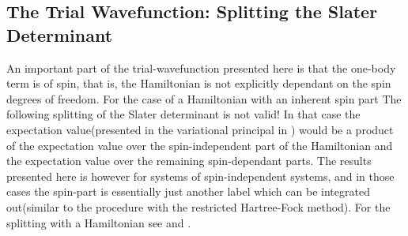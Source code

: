     \subsection{The Trial Wavefunction: Splitting the Slater Determinant}
        An important part of the trial-wavefunction presented here is that the
        one-body term is  of spin, that is, the Hamiltonian
        is not explicitly dependant on the spin degrees of freedom. For the
        case of a Hamiltonian with an inherent spin part The following
        splitting of the Slater determinant is not valid! In that case the
        expectation value(presented in the variational principal in
        ) would be a product of the expectation value over the
        spin-independent part of the Hamiltonian and the expectation value over
        the remaining spin-dependant parts\cite{spinDep}. The results presented
        here is however for systems of spin-independent systems, and in those
        cases the spin-part is essentially just another label which can be
        integrated out(similar to the procedure with the restricted
        Hartree-Fock method). For the splitting with a 
        Hamiltonian see \cite{splitDet} and \cite{basicMB}. \\
        
